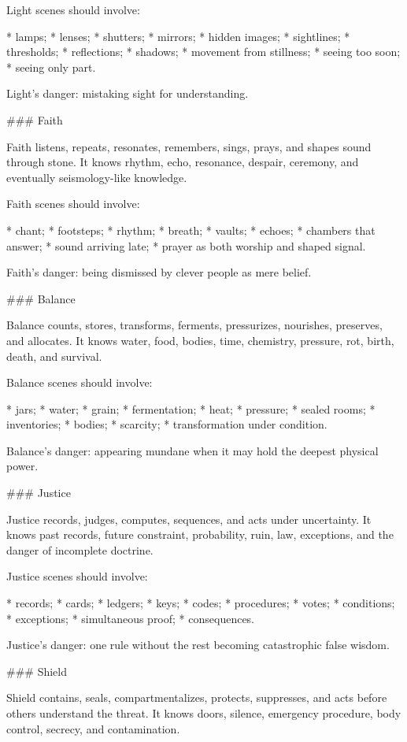 Light scenes should involve:

* lamps;
* lenses;
* shutters;
* mirrors;
* hidden images;
* sightlines;
* thresholds;
* reflections;
* shadows;
* movement from stillness;
* seeing too soon;
* seeing only part.

Light’s danger: mistaking sight for understanding.

### Faith

Faith listens, repeats, resonates, remembers, sings, prays, and shapes sound through stone. It knows rhythm, echo, resonance, despair, ceremony, and eventually seismology-like knowledge.

Faith scenes should involve:

* chant;
* footsteps;
* rhythm;
* breath;
* vaults;
* echoes;
* chambers that answer;
* sound arriving late;
* prayer as both worship and shaped signal.

Faith’s danger: being dismissed by clever people as mere belief.

### Balance

Balance counts, stores, transforms, ferments, pressurizes, nourishes, preserves, and allocates. It knows water, food, bodies, time, chemistry, pressure, rot, birth, death, and survival.

Balance scenes should involve:

* jars;
* water;
* grain;
* fermentation;
* heat;
* pressure;
* sealed rooms;
* inventories;
* bodies;
* scarcity;
* transformation under condition.

Balance’s danger: appearing mundane when it may hold the deepest physical power.

### Justice

Justice records, judges, computes, sequences, and acts under uncertainty. It knows past records, future constraint, probability, ruin, law, exceptions, and the danger of incomplete doctrine.

Justice scenes should involve:

* records;
* cards;
* ledgers;
* keys;
* codes;
* procedures;
* votes;
* conditions;
* exceptions;
* simultaneous proof;
* consequences.

Justice’s danger: one rule without the rest becoming catastrophic false wisdom.

### Shield

Shield contains, seals, compartmentalizes, protects, suppresses, and acts before others understand the threat. It knows doors, silence, emergency procedure, body control, secrecy, and contamination.

